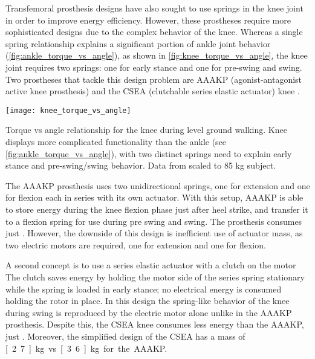Transfemoral prosthesis designs have also sought to use springs in the knee
joint in order to improve energy efficiency. However, these prostheses require
more sophisticated designs due to the complex behavior of the knee. Whereas a
single spring relationship explains a significant portion of ankle joint
behavior (\cref{fig:ankle_torque_vs_angle}), as shown in
\cref{fig:knee_torque_vs_angle}, the knee joint requires two springs: one for
early stance and one for pre-swing and swing. Two prostheses that tackle this
design problem are AAAKP (agonist-antagonist active knee prosthesis)
\citep{martinez2008design, martinez2011antagonistic} and the CSEA (clutchable
series elastic actuator) knee \citep{rouse2014clutchable, rouse2015design}.

\begin{marginfigure}
    \centering
    \texttt{[image: knee\_torque\_vs\_angle]}
    \caption{Torque vs angle relationship for the knee during level ground
    walking. Knee displays more complicated functionality than the ankle (see
    \cref{fig:ankle_torque_vs_angle}), with two distinct springs need to explain
    early stance and pre-swing/swing behavior. Data from
    \citet{winter2009biomechanics} scaled to 85 kg subject.}
    \label{fig:knee_torque_vs_angle}
\end{marginfigure}

The AAAKP prosthesis uses two unidirectional springs, one for extension and one
for flexion each in series with its own actuator. With this setup,
AAAKP is able to store energy during the knee flexion phase just after heel
strike, and transfer it to a flexion spring for use during pre swing and swing.
The prosthesis consumes just . However, the downside of
this design is inefficient use of actuator mass, as two electric motors are
required, one for extension and one for flexion.

A second concept is to use a series elastic actuator with a clutch on the motor
\citep{rouse2014clutchable, rouse2015design} The clutch saves energy by holding
the motor side of the series spring stationary while the spring is loaded in
early stance; no electrical energy is consumed holding the rotor in place. In
this design the spring-like behavior of the knee during swing is reproduced by
the electric motor alone unlike in the AAAKP prosthesis. Despite this, the
CSEA knee consumes less energy than the AAAKP, just .
Moreover, the simplified design of the CSEA has a mass of \unit[2.7]{kg} vs
\unit[3.6]{kg} for the AAAKP.


